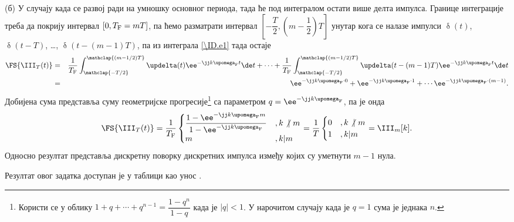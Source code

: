 (б) У случају када се развој ради на умношку основног периода, тада ће под интегралом остати више делта импулса. 
Границе интеграције треба да покрију интервал $[0, T_{\rm F} = mT]$, па ћемо разматрати интервал 
$\left[-\dfrac{T}{2}, \left(m -\dfrac{1}{2}\right) T \right]$ унутар кога се налазе импулси 
$\updelta(t)$, $\updelta(t - T)$, \ldots, $\updelta(t - (m-1)T)$, па из интеграла \eqref{\ID.e1} тада остаје 
\begin{eqnarray}
    \FS{\III_{T}(t)} &=& \dfrac{1}{T_{\rm F}} 
    \int_{\mathclap{-T/2}}^{\mathclap{(m-1/2)T}} \updelta(t) \ee^{-\jj k \upomega_{\rm F} t} \de t
    + \cdots + 
    \dfrac{1}{T_{\rm F}} 
    \int_{\mathclap{-T/2}}^{\mathclap{(m-1/2)T}} \updelta(t - (m-1)T) \ee^{-\jj k \upomega_{\rm F} t} \de t \\
    &=&
    \ee^{-\jj k \upomega_{\rm F} \cdot 0} +\ee^{-\jj k \upomega_{\rm F} \cdot 1} +
    \cdots \ee^{-\jj k \upomega_{\rm F} \cdot (m-1)}. 
\end{eqnarray}
Добијена сума представља суму геометријске прогресије\footnote{Користи се у облику 
$1 + q + \cdots + q^{n-1} = \dfrac{1 - q^n}{1-q}$ када је $|q|<1$. У нарочитом случају када је 
$q = 1$ сума је једнака $n$.} са параметром $q = \ee^{-\jj k \upomega_{\rm F}}$, па је онда 
\begin{equation}
    \FS{\III_{T}(t)} = \dfrac{1}{T_{\rm F}}   
    \begin{cases}
        \dfrac{1 - \ee^{-\jj k \upomega_{\rm F}m}}{1-\ee^{-\jj k \upomega_{\rm F}}}  &, k\not |\ m \\ 
        m &, k \vert m  \\ 
    \end{cases}
    = \dfrac{1}{T}
    \begin{cases}
        0 &, k\not |\ m \\ 
        1 &, k \vert m  \\         
    \end{cases}
    = 
    \III_m[k].
\end{equation}
Односно резултат представља дискретну поворку дискретних импулса између којих су уметнути $m-1$ нула. 

Резултат овог задатка доступан је у таблици као унос .